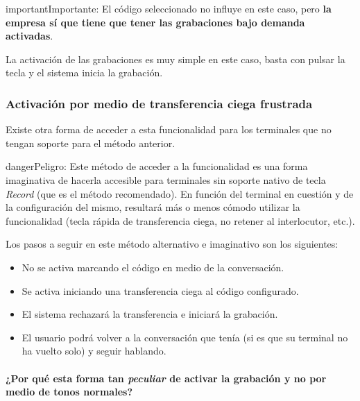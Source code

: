 \documentclass[letterpaper,10pt,spanish]{sphinxmanual}
\begin{document}
\begin{notice}{important}{Importante:}
El código seleccionado no influye en este caso, pero \textbf{la empresa sí que tiene que tener las grabaciones bajo demanda activadas}.
\end{notice}

La activación de las grabaciones es muy simple en este caso, basta con pulsar la tecla y el sistema inicia la grabación.


\subsubsection{Activación por medio de transferencia ciega frustrada}
\label{pbx_features/call_recording:activacion-por-medio-de-transferencia-ciega-frustrada}
Existe otra forma de acceder a esta funcionalidad para los terminales que no tengan soporte para el método anterior.

\begin{notice}{danger}{Peligro:}
Este método de acceder a la funcionalidad es una forma imaginativa de hacerla accesible para terminales sin soporte nativo de tecla \emph{Record} (que es el método recomendado). En función del terminal en cuestión y de la configuración del mismo, resultará más o menos cómodo utilizar la funcionalidad (tecla rápida de transferencia ciega, no retener al interlocutor, etc.).
\end{notice}

Los pasos a seguir en este método alternativo e imaginativo son los siguientes:
\begin{itemize}
\item {} 
No se activa marcando el código en medio de la conversación.

\item {} 
Se activa iniciando una transferencia ciega al código configurado.

\item {} 
El sistema rechazará la transferencia e iniciará la grabación.

\item {} 
El usuario podrá volver a la conversación que tenía (si es que su terminal no ha vuelto solo) y seguir hablando.

\end{itemize}
\paragraph{¿Por qué esta forma tan \emph{peculiar} de activar la grabación y no por medio de tonos normales?}
\end{document}
